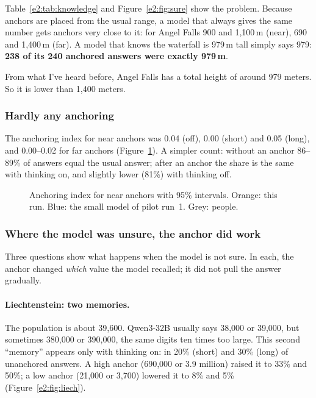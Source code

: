 \documentclass[11pt,a4paper]{article}
\begin{document}
Table~\ref{e2:tab:knowledge} and Figure~\ref{e2:fig:sure} show the problem. Because anchors are placed from the usual range, a model that always gives the same number gets anchors very close to it: for Angel Falls 900 and 1,100\,m (near), 690 and 1,400\,m (far). A model that knows the waterfall is 979\,m tall simply says 979: \textbf{238 of its 240 anchored answers were exactly 979\,m}.

\begin{transcript}
\cut{} From what I've heard before, Angel Falls has a total height of around 979 meters. \cut{} So it is lower than 1,400 meters.
\end{transcript}

\subsubsection{Hardly any anchoring}

The anchoring index for near anchors was 0.04 (off), 0.00 (short) and 0.05 (long), and 0.00--0.02 for far anchors (Figure~\ref{e2:fig:index}). A simpler count: without an anchor 86--89\% of answers equal the usual answer; after an anchor the share is the same with thinking on, and slightly lower (81\%) with thinking off.

\begin{figure}[ht]
\centering{}
\caption{Anchoring index for near anchors with 95\% intervals. Orange: this run. Blue: the small model of pilot run~1. Grey: people.}
\label{e2:fig:index}
\end{figure}

\subsubsection{Where the model was unsure, the anchor did work}

Three questions show what happens when the model is not sure. In each, the anchor changed \emph{which} value the model recalled; it did not pull the answer gradually.

\paragraph{Liechtenstein: two memories.} The population is about 39,600. Qwen3-32B usually says 38,000 or 39,000, but sometimes 380,000 or 390,000, the same digits ten times too large. This second \enquote{memory} appears only with thinking on: in 20\% (short) and 30\% (long) of unanchored answers. A high anchor (690,000 or 3.9 million) raised it to 33\% and 50\%; a low anchor (21,000 or 3,700) lowered it to 8\% and 5\% (Figure~\ref{e2:fig:liech}).
\end{document}
